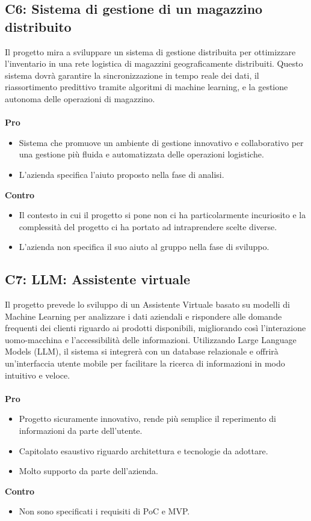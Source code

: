 \subsection{C6: Sistema di gestione di un magazzino distribuito}
Il progetto mira a sviluppare un sistema di gestione distribuita per ottimizzare l'inventario in una rete logistica di magazzini geograficamente distribuiti. Questo sistema dovrà garantire la sincronizzazione in tempo reale dei dati, il riassortimento predittivo tramite algoritmi di machine learning, e la gestione autonoma delle operazioni di magazzino.\\\\
\textbf{Pro}
\begin{itemize}
    \item Sistema che promuove un ambiente di gestione innovativo e collaborativo per una gestione più fluida e automatizzata delle operazioni logistiche.
    \item L'azienda specifica l'aiuto proposto nella fase di analisi.
\end{itemize}
\textbf{Contro}
\begin{itemize}
    \item Il contesto in cui il progetto si pone non ci ha particolarmente incuriosito e la complessità del progetto ci ha portato ad intraprendere scelte diverse.
    \item L'azienda non specifica il suo aiuto al gruppo nella fase di sviluppo.
\end{itemize}


\subsection{C7: LLM: Assistente virtuale}
Il progetto prevede lo sviluppo di un Assistente Virtuale basato su modelli di Machine Learning per analizzare i dati aziendali e rispondere alle domande frequenti dei clienti riguardo ai prodotti disponibili, migliorando così l'interazione uomo-macchina e l'accessibilità delle informazioni. Utilizzando Large Language Models (LLM), il sistema si integrerà con un database relazionale e offrirà un'interfaccia utente mobile per facilitare la ricerca di informazioni in modo intuitivo e veloce.\\\\
\textbf{Pro}
\begin{itemize}
    \item Progetto sicuramente innovativo, rende più semplice il reperimento di informazioni da parte dell'utente.
    \item Capitolato esaustivo riguardo architettura e tecnologie da adottare.
    \item Molto supporto da parte dell'azienda.
\end{itemize}
\textbf{Contro}
\begin{itemize}
    \item Non sono specificati i requisiti di PoC e MVP.
\end{itemize}


